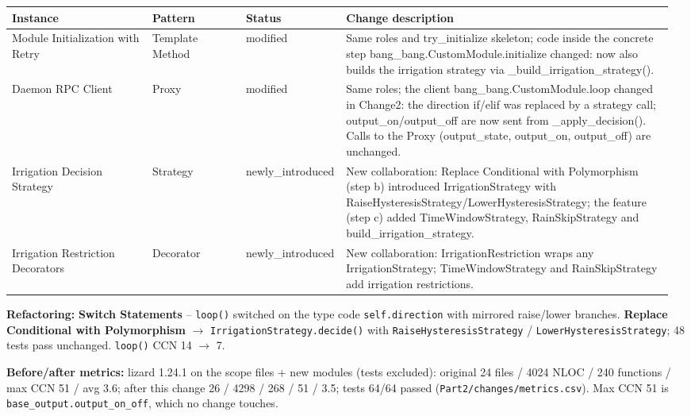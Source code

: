 \documentclass[11pt,a4paper]{article}
\newcommand{\field}[2]{\textbf{#1:} #2\par}
\begin{document}
{\small\setlength{\tabcolsep}{3pt}
\begin{longtable}{@{}P{0.21\linewidth}P{0.14\linewidth}P{0.13\linewidth}P{0.49\linewidth}@{}}\toprule
\textbf{Instance} & \textbf{Pattern} & \textbf{Status} & \textbf{Change description} \\ \midrule\endhead
Module Initialization with Retry & Template Method & modified & Same roles and try\_initialize skeleton; code inside the concrete step bang\_bang.CustomModule.initialize changed: now also builds the irrigation strategy via \_build\_irrigation\_strategy(). \\
Daemon RPC Client & Proxy & modified & Same roles; the client bang\_bang.CustomModule.loop changed in Change2: the direction if/elif was replaced by a strategy call; output\_on/output\_off are now sent from \_apply\_decision(). Calls to the Proxy (output\_state, output\_on, output\_off) are unchanged. \\
Irrigation Decision Strategy & Strategy & newly\_introduced & New collaboration: Replace Conditional with Polymorphism (step b) introduced IrrigationStrategy with RaiseHysteresisStrategy/LowerHysteresisStrategy; the feature (step c) added TimeWindowStrategy, RainSkipStrategy and build\_irrigation\_strategy. \\
Irrigation Restriction Decorators & Decorator & newly\_introduced & New collaboration: IrrigationRestriction wraps any IrrigationStrategy; TimeWindowStrategy and RainSkipStrategy add irrigation restrictions. \\
\bottomrule\end{longtable}}
\field{Refactoring}{\textbf{Switch Statements} -- \texttt{loop()} switched on the type code \texttt{self.\allowbreak{}direction} with mirrored raise/lower branches. \textbf{Replace Conditional with Polymorphism} $\rightarrow$ \texttt{IrrigationStrategy.\allowbreak{}decide()} with \texttt{RaiseHysteresisStrategy} / \texttt{LowerHysteresisStrategy}; 48 tests pass unchanged. \texttt{loop()} CCN 14 $\rightarrow$ 7.}
\field{Before/after metrics}{lizard 1.24.1 on the scope files + new modules (tests excluded): original 24 files / 4024 NLOC / 240 functions / max CCN 51 / avg 3.6; after this change 26 / 4298 / 268 / 51 / 3.5; tests 64/64 passed (\texttt{Part2/\allowbreak{}changes/\allowbreak{}metrics.\allowbreak{}csv}). Max CCN 51 is \texttt{base\_\allowbreak{}output.\allowbreak{}output\_\allowbreak{}on\_\allowbreak{}off}, which no change touches.}
\end{document}
